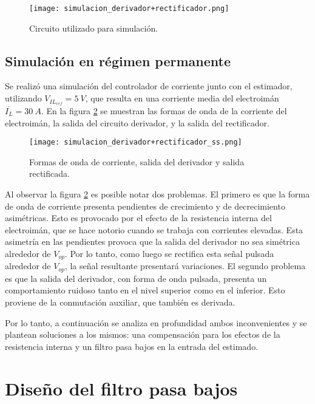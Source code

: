 \begin{figure}[H]
	\centering
	\texttt{[image: simulacion\_derivador+rectificador.png]}
	\caption{Circuito utilizado para simulación.}
	\label{fig:img_simulacion_derivador+rectificador}
\end{figure}

\subsection{Simulación en régimen permanente}

Se realizó una simulación del controlador de corriente junto con el estimador, utilizando $V_{IL_{ref}}=5\:V$, que resulta en una corriente media del electroimán $\overline{I_L}=30\:A$. En la figura \ref{fig:img_simulacion_derivador+rectificador_ss} se muestran las formas de onda de la corriente del electroimán, la salida del circuito derivador, y la salida del rectificador. 

\begin{figure}[H]
	\centering
	\texttt{[image: simulacion\_derivador+rectificador\_ss.png]}
	\caption{Formas de onda de corriente, salida del derivador y salida rectificada.}
	\label{fig:img_simulacion_derivador+rectificador_ss}
\end{figure}

Al observar la figura \ref{fig:img_simulacion_derivador+rectificador_ss} es posible notar dos problemas. El primero es que la forma de onda de corriente presenta pendientes de crecimiento y de decrecimiento asimétricas. Esto es provocado por el efecto de la resistencia interna del electroimán, que se hace notorio cuando se trabaja con corrientes elevadas. Esta asimetría en las pendientes provoca que la salida del derivador no sea simétrica alrededor de $V_{op}$. Por lo tanto, como luego se rectifica esta señal pulsada alrededor de $V_{op}$, la señal resultante presentará variaciones. El segundo problema es que la salida del derivador, con forma de onda pulsada, presenta un comportamiento ruidoso tanto en el nivel superior como en el inferior. Esto proviene de la conmutación auxiliar, que también es derivada. 

Por lo tanto, a continuación se analiza en profundidad ambos inconvenientes y se plantean soluciones a los mismos: una compensación para los efectos de la resistencia interna y un filtro pasa bajos en la entrada del estimado.

\section{Diseño del filtro pasa bajos}

